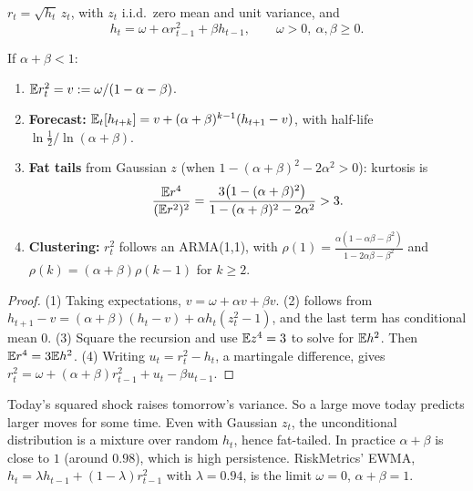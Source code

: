 \begin{definition}
$r_t=\sqrt{h_t}\,z_t$, with $z_t$ i.i.d.\ zero mean and unit variance, and
\[
h_t=\omega+\alpha r_{t-1}^2+\beta h_{t-1},\qquad\omega>0,\ \alpha,\beta\ge0.
\]
\end{definition}

\begin{proposition}
If $\alpha+\beta<1$:
\begin{enumerate}
\item $\mathbb{E} r_t^2=v:=\omega/(1-\alpha-\beta)$.
\item \textbf{Forecast:} $\mathbb{E}_t[h_{t+k}]=v+(\alpha+\beta)^{k-1}(h_{t+1}-v)$, with half-life $\ln\tfrac12/\ln(\alpha+\beta)$.
\item \textbf{Fat tails} from Gaussian $z$ (when $1-(\alpha+\beta)^2-2\alpha^2>0$): kurtosis is
\[
\frac{\mathbb{E} r^4}{(\mathbb{E} r^2)^2}=\frac{3\bigl(1-(\alpha+\beta)^2\bigr)}{1-(\alpha+\beta)^2-2\alpha^2}>3.
\]
\item \textbf{Clustering:} $r_t^2$ follows an ARMA(1,1), with $\rho(1)=\frac{\alpha(1-\alpha\beta-\beta^2)}{1-2\alpha\beta-\beta^2}$ and $\rho(k)=(\alpha+\beta)\rho(k-1)$ for $k\ge2$.
\end{enumerate}
\end{proposition}
\begin{proof}
(1) Taking expectations, $v=\omega+\alpha v+\beta v$. (2) follows from $h_{t+1}-v=(\alpha+\beta)(h_t-v)+\alpha h_t(z_t^2-1)$, and the last term has conditional mean $0$. (3) Square the recursion and use $\mathbb{E} z^4=3$ to solve for $\mathbb{E} h^2$. Then $\mathbb{E} r^4=3\mathbb{E} h^2$. (4) Writing $u_t=r_t^2-h_t$, a martingale difference, gives $r_t^2=\omega+(\alpha+\beta)r_{t-1}^2+u_t-\beta u_{t-1}$.
\end{proof}

\begin{intuition}
Today's squared shock raises tomorrow's variance. So a large move today predicts larger moves for some time. Even with Gaussian $z_t$, the unconditional distribution is a mixture over random $h_t$, hence fat-tailed. In practice $\alpha+\beta$ is close to $1$ (around $0.98$), which is high persistence. RiskMetrics' EWMA, $h_t=\lambda h_{t-1}+(1-\lambda)r_{t-1}^2$ with $\lambda=0.94$, is the limit $\omega=0$, $\alpha+\beta=1$.
\end{intuition}

